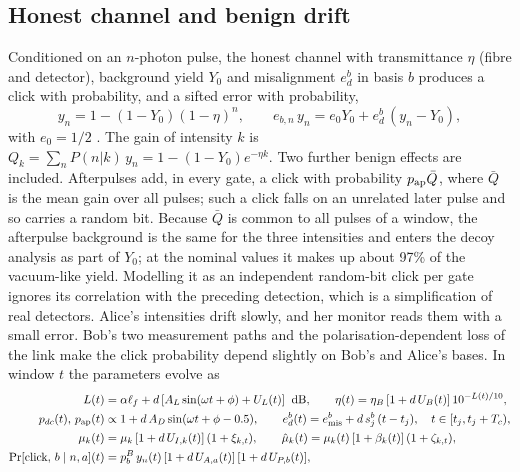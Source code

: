 \subsection{Honest channel and benign drift}
Conditioned on an $n$-photon pulse, the honest channel with transmittance $\eta$ (fibre and detector), background yield $Y_0$ and misalignment $e_d^b$ in basis $b$ produces a click with probability, and a sifted error with probability,
\begin{equation}\label{eq:honest}
y_n=1-(1-Y_0)(1-\eta)^n,\qquad e_{b,n}\,y_n=e_0Y_0+e_d^b\,(y_n-Y_0),
\end{equation}
with $e_0=1/2$ \cite{ma2005}. The gain of intensity $k$ is $Q_k=\sum_n P(n|k)\,y_n=1-(1-Y_0)e^{-\eta k}$. Two further benign effects are included. Afterpulses add, in every gate, a click with probability $p_{\rm ap}\bar Q$, where $\bar Q$ is the mean gain over all pulses; such a click falls on an unrelated later pulse and so carries a random bit. Because $\bar Q$ is common to all pulses of a window, the afterpulse background is the same for the three intensities and enters the decoy analysis as part of $Y_0$; at the nominal values it makes up about 97\% of the vacuum-like yield. Modelling it as an independent random-bit click per gate ignores its correlation with the preceding detection, which is a simplification of real detectors. Alice's intensities drift slowly, and her monitor reads them with a small error. Bob's two measurement paths and the polarisation-dependent loss of the link make the click probability depend slightly on Bob's and Alice's bases. In window $t$ the parameters evolve as
\begin{align}
L(t)&=\alpha\ell_f+d\,[A_L\sin(\omega t+\phi)+U_L(t)] \;\;\mathrm{dB},\qquad
\eta(t)=\eta_B\,[1+d\,U_B(t)]\,10^{-L(t)/10},\\
p_{dc}(t),\,p_{\rm ap}(t)&\propto 1+d\,A_D\sin(\omega t+\phi-0.5),\qquad
e_d^b(t)=e_{\mathrm{mis}}^b+d\,s_j^b\,(t-t_j),\quad t\in[t_j,t_j+T_c),\\
\mu_k(t)&=\mu_k\,[1+d\,U_{I,k}(t)]\,(1+\xi_{k,t}),\qquad \hat\mu_k(t)=\mu_k(t)\,[1+\beta_k(t)]\,(1+\zeta_{k,t}),\\
\Pr[\text{click},\,b\mid n,a](t)&=p^B_b\,y_n(t)\,[1+d\,U_{A,a}(t)]\,[1+d\,U_{P,b}(t)],
\end{align}
